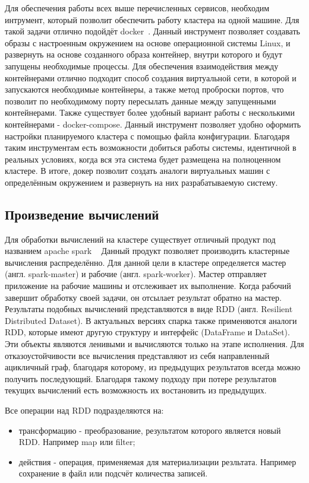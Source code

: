 Для обеспечения работы всех выше перечисленных сервисов, необходим интрумент, который позволит обеспечить работу кластера на одной машине.
Для такой задачи отлично подойдёт docker~\cite{docker_documentation_intro}.
Данный инструмент позволяет создавать образы с настроенным окружением на основе операционной системы Linux, и развернуть на основе созданного образа контейнер, внутри которого и будут запущены необходимые процессы.
Для обеспечения взаимодействия между контейнерами отлично подходит способ создания виртуальной сети, в которой и запускаются необходимые контейнеры, а также метод проброски портов, что позволит по необходимому порту пересылать данные между запущенными контейнерами.
Также существует более удобный вариант работы с несколькими контейнерами - docker-compose.
Данный инструмент позволяет удобно оформить настройки планируемого кластера с помощью файла конфигурации.
Благодаря таким инструментам есть возможности добиться работы системы, идентичной в реальных условиях, когда вся эта система будет размещена на полноценном кластере.
В итоге, докер позволит создать аналоги виртуальных машин с определённым окружением и развернуть на них разрабатываемую систему.

\subsection{Произведение вычислений}

Для обработки вычислений на кластере существует отличный продукт под названием apache spark ~\cite{spark_documentation_intro}
Данный продукт позволяет производить кластерные вычисления распределённо.
Для данной цели в кластере определяется мастер (англ. spark-master) и рабочие (англ. spark-worker).
Мастер отправляет приложение на рабочие машины и отслеживает их выполнение.
Когда рабочий завершит обработку своей задачи, он отсылает результат обратно на мастер.
Результаты подобных вычислений представляются в виде RDD (англ. Resilient Distributed Dataset). 
В актуальных версиях спарка также применяются аналоги RDD, которые имеют другую структуру и интерфейс (DataFrame и DataSet).
Эти объекты являются ленивыми и вычисляются только на этапе исполнения.
Для отказоустойчивости все вычисления представляют из себя направленный ацикличный граф, благодаря которому, из предыдущих результатов всегда можно получить последующий.
Благодаря такому подходу при потере результатов текущих вычислений есть возможность их востановить из предыдущих.

Все операции над RDD подразделяются на:
\begin{itemize}
    \item трансформацию - преобразование, результатом которого является новый RDD. Например map или filter;
    \item действия - операция, применяемая для материализации резльтата. Например сохранение в файл или подсчёт количества записей.
\end{itemize}

